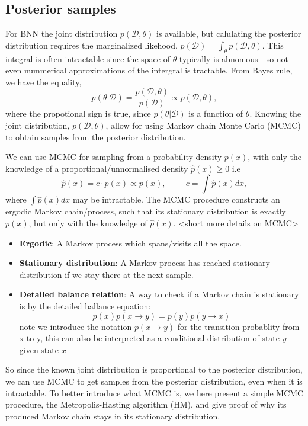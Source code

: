 \subsection*{Posterior samples}
For BNN the joint distribution $p(\mathcal{D},\theta)$ is available, but calulating the posterior
distribution requires the marginalized likehood, $p(\mathcal{D}) = \int_{\theta}
p(\mathcal{D},\theta)$. This integral is often intractable since the space of $\theta$ typically is
abnomous - so not even nummerical approximations of the intergral is tractable. From Bayes rule, we
have the equality, 
$$p(\theta|\mathcal{D}) = \frac{p(\mathcal{D},\theta)}{p(\mathcal{D})} \propto
p(\mathcal{D},\theta),$$ where the propotional sign is true, since $p(\theta|\mathcal{D})$ is a
function of $\theta$. Knowing the joint distribution, $p(\mathcal{D},\theta)$, allow for using Markov
chain Monte Carlo (MCMC) to obtain samples from the posterior distribution.  

\begin{testexample2}
    We can use MCMC for sampling from a probability density $p(x)$, with only the knowledge of a 
    proportional/unnormalised density $\hat p(x) \geq 0$ i.e
    $$\hat p(x) = c\cdot p(x) \propto p(x), \hspace{1cm} c = \int \hat p(x) dx,$$ where $\int \hat
    p(x) dx$ may be intractable. The MCMC procedure constructs an ergodic Markov
    chain/process, such that its stationary distribution is exactly $p(x)$, but only
    with the knowledge of $\hat p(x)$. 
    <short more details on MCMC>
    \begin{itemize}[noitemsep]
        \item \textbf{Ergodic}: A Markov process which spans/visits all the space. 
        \item \textbf{Stationary distribution}: A Markov process has reached stationary distribution if
                            we stay there at the next sample. 
        \item \textbf{Detailed balance relation}: A way to check if a Markov chain is
        stationary is by the detailed ballance equation: $$p(x)p(x\rightarrow y) =
        p(y)p(y\rightarrow x)$$ note we introduce the notation $p(x\rightarrow y)$ for the
        transition probablity from x to y, this can also be interpreted as a conditional
        distribution of state $y$ given state $x$  
    \end{itemize}
\end{testexample2}
So since the known joint distribution is proportional to the posterior distribution, we can use MCMC
to get samples from the posterior distribution, even when it is intractable. To better introduce
what MCMC is, we here present a simple MCMC procedure, the Metropolis-Hasting algorithm (HM), and
give proof of why its produced Markov chain stays in its stationary distribution.

